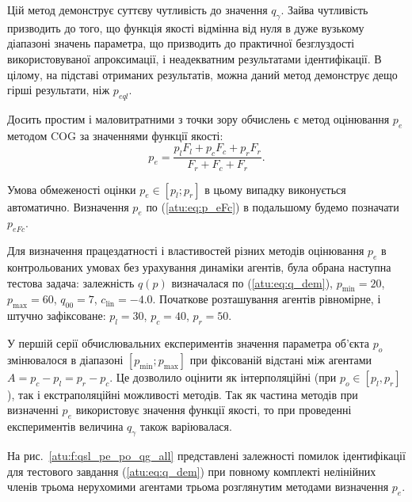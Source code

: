 \documentclass[a4paper,13pt]{atuaref}
\begin{document}
Цій метод демонструє суттєву чутливість до значення $q_\gamma$.
Зайва чутливість призводить до того, що функція якості відмінна від нуля в
дуже вузькому діапазоні значень параметра, що призводить до практичної
безглуздості використовуваної апроксимації, і неадекватним результатами
ідентифікації.
В цілому, на підставі отриманих результатів, можна даний метод демонструє дещо
гірші результати, ніж $ p_{eql} $.

Досить простим і маловитратними з точки зору обчислень є метод оцінювання $ p_e $ методом
COG за значеннями функції якості:
%
\begin{equation}
  p_e =
  \frac{p_l F_l + p_c F_c + p_r F_r}{ F_r + F_c + F_r}  .
  \label{atu:eq:p_eFc}
\end{equation}

Умова обмеженості оцінки $ p_e \in [p_l; p_r] $ в цьому випадку виконується
автоматично. Визначення $ p_e $ по (\ref{atu:eq:p_eFc}) в подальшому будемо позначати $p_{eFc}$.

Для визначення працездатності і властивостей різних методів оцінювання $ p_e $
в контрольованих умовах без урахування динаміки агентів, була обрана наступна
тестова задача: залежність $ q (p) $ визначалася по (\ref{atu:eq:q_dem}),
$p_{\min}=20$, $p_{\max}=60$,
$q_{00}=7$, $c_\mathrm{lin}=-4.0$.
Початкове розташування агентів рівномірне, і штучно зафіксоване:
$p_l=30$, $p_c=40$,  $p_r=50$.

У першій серії обчислювальних експериментів значення параметра об'єкта $ p_o $
змінювалося в діапазоні $ [p_ {\min}; p_{\max}] $ при фіксованій відстані
між агентами $ A = p_c - p_l = p_r - p_c $. Це дозволило оцінити як
інтерполяційні (при $ p_o \in [p_l, p_r] $), так і екстраполяційні можливості
методів. Так як частина методів при визначенні $ p_e $ використовує значення
функції якості, то при проведенні експериментів величина $ q_\gamma $ також
варіювалася.

На рис.~\ref{atu:f:qsl_pe_po_qg_all} представлені залежності помилок
ідентифікації для тестового завдання (\ref{atu:eq:q_dem}) при повному
комплекті нелінійних членів  трьома нерухомими
агентами трьома розглянутим методами визначення $ p_e $.
\end{document}

